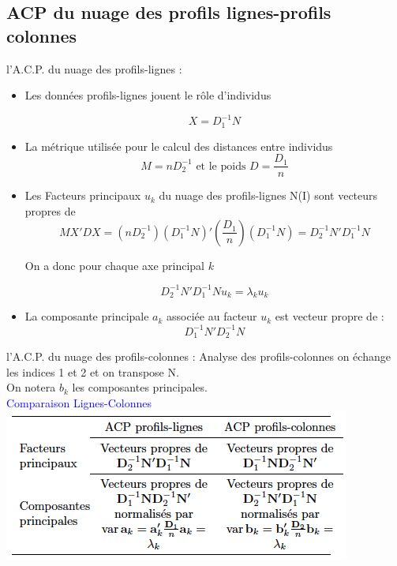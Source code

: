 \documentclass[11pt]{beamer}
\begin{document}
\subsection{ACP du nuage des profils lignes-profils colonnes }
\begin{frame}{l’A.C.P. du nuage des profils-lignes :}
\begin{itemize}

\item Les données profils-lignes jouent le rôle d'individus 

$$ X= D_1^{-1}N$$

\item La métrique utilisée pour le calcul des distances entre
individus  $$ M=nD_2^{-1} \text{ et le poids } D= \frac{D_1}{n}$$

\item Les Facteurs principaux $u_k$ du nuage des profils-lignes N(I) sont vecteurs propres de $$MX'DX=(nD_2^{-1}) (D_1^{-1}N)'(\frac{D_1}{n})(D_1^{-1}N)=D_2^{-1}N'D_1^{-1}N$$ 

On a donc pour chaque axe principal $k$

 $$D_2^{-1}N'D_1^{-1}Nu_k=\lambda_ku_k$$

\item La composante principale $a_k$  associée au facteur $u_k$ est  vecteur propre de  :  $$D_1^{-1}N'D_2^{-1}N$$
\end{itemize}
\end{frame}

\begin{frame}{l’A.C.P. du nuage des profils-colonnes :}
Analyse des profils-colonnes on échange les indices 1 et 2
et on transpose N. \\

On notera $b_k$ les composantes principales. \\ 
\centering 
\textcolor{blue}{Comparaison Lignes-Colonnes}
\includegraphics[scale=.7]{Synthese.png} 

\end{frame}
\end{document}
